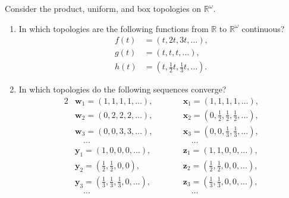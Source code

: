 \documentclass[a4paper,10pt]{article}
\newcommand{\bx}{\mathbf{x}}
\newcommand{\by}{\mathbf{y}}
\newcommand{\bz}{\mathbf{z}}
\newcommand{\bw}{\mathbf{w}}
\newcommand{\RR}{\mathbb{R}}
\begin{document}
\begin{exercise}[ID=2.20.4]
    Consider the product, uniform, and box topologies on $\RR^\omega$.
    \begin{enumerate}[label={(\alph*)}, align=left, leftmargin=\parindent, listparindent=\parindent, labelwidth=0pt, itemindent=!]
        \item In which topologies are the following functions from $\RR$ to $\RR^\omega$ continuous?
        \begin{align*}
            f(t) &= (t, 2t, 3t, \ldots), \\
            g(t) &= (t, t, t, \ldots), \\
            h(t) &= (t, \tfrac{1}{2} t, \tfrac{1}{3} t, \ldots).
        \end{align*}
        \item In which topologies do the following sequences converge?
        \begin{alignat*}{2}
            & \bw_1 = (1, 1, 1, 1, \ldots),\qquad   & & \bx_1 = (1, 1, 1, 1, \ldots), \\
            & \bw_2 = (0, 2, 2, 2, \ldots),\qquad   & & \bx_2 = (0, \tfrac{1}{2}, \tfrac{1}{2}, \tfrac{1}{2}, \ldots), \\
            & \bw_3 = (0, 0, 3, 3, \ldots),\qquad   & & \bx_3 = (0, 0, \tfrac{1}{3}, \tfrac{1}{3}, \ldots), \\
            & \quad\ldots                           & & \quad\ldots \\
            & \by_1 = (1, 0, 0, 0, \ldots),\qquad   & & \bz_1 = (1, 1, 0, 0, \ldots), \\
            & \by_2 = (\tfrac{1}{2}, \tfrac{1}{2}, 0, 0),                       & & \bz_2 = (\tfrac{1}{2}, \tfrac{1}{2}, 0, 0, \ldots), \\
            & \by_3 = (\tfrac{1}{3}, \tfrac{1}{3}, \tfrac{1}{3}, 0, \ldots),    & & \bz_3 = (\tfrac{1}{3}, \tfrac{1}{3}, 0, 0, \ldots), \\
            & \quad\ldots                                                       & & \quad\ldots
        \end{alignat*}
    \end{enumerate}
\end{exercise}
\end{document}
